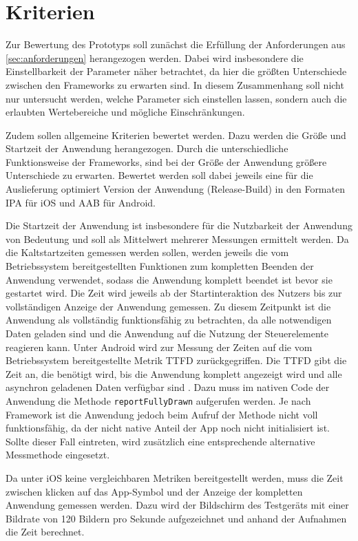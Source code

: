 \section{Kriterien}
\label{sec:kriterien}

Zur Bewertung des Prototyps soll zunächst die Erfüllung der Anforderungen aus \autoref{sec:anforderungen} herangezogen werden.
Dabei wird insbesondere die Einstellbarkeit der Parameter näher betrachtet, da hier die größten Unterschiede zwischen den Frameworks zu erwarten sind.
In diesem Zusammenhang soll nicht nur untersucht werden, welche Parameter sich einstellen lassen, sondern auch die erlaubten Wertebereiche und mögliche Einschränkungen.

Zudem sollen allgemeine Kriterien bewertet werden.
Dazu werden die Größe und Startzeit der Anwendung herangezogen.
Durch die unterschiedliche Funktionsweise der Frameworks, sind bei der Größe der Anwendung größere Unterschiede zu erwarten.
Bewertet werden soll dabei jeweils eine für die Auslieferung optimiert Version der Anwendung (Release-Build) in den Formaten \ac{IPA} für iOS und \ac{AAB} für Android.

Die Startzeit der Anwendung ist insbesondere für die Nutzbarkeit der Anwendung von Bedeutung und soll als Mittelwert mehrerer Messungen ermittelt werden.
Da die Kaltstartzeiten gemessen werden sollen, werden jeweils die vom Betriebssystem bereitgestellten Funktionen zum kompletten Beenden der Anwendung verwendet, sodass die Anwendung komplett beendet ist bevor sie gestartet wird.
Die Zeit wird jeweils ab der Startinteraktion des Nutzers bis zur vollständigen Anzeige der Anwendung gemessen.
Zu diesem Zeitpunkt ist die Anwendung als vollständig funktionsfähig zu betrachten, da alle notwendigen Daten geladen sind und die Anwendung auf die Nutzung der Steuerelemente reagieren kann.
Unter Android wird zur Messung der Zeiten auf die vom Betriebssystem bereitgestellte Metrik \ac{TTFD} zurückgegriffen.
Die \ac{TTFD} gibt die Zeit an, die benötigt wird, bis die Anwendung komplett angezeigt wird und alle asynchron geladenen Daten verfügbar sind \cite{Android_LaunchTime}.
Dazu muss im nativen Code der Anwendung die Methode \texttt{reportFullyDrawn} aufgerufen werden.
Je nach Framework ist die Anwendung jedoch beim Aufruf der Methode nicht voll funktionsfähig, da der nicht native Anteil der App noch nicht initialisiert ist.
Sollte dieser Fall eintreten, wird zusätzlich eine entsprechende alternative Messmethode eingesetzt.

Da unter iOS keine vergleichbaren Metriken bereitgestellt werden, muss die Zeit zwischen klicken auf das App-Symbol und der Anzeige der kompletten Anwendung gemessen werden.
Dazu wird der Bildschirm des Testgeräts mit einer Bildrate von 120 Bildern pro Sekunde aufgezeichnet und anhand der Aufnahmen die Zeit berechnet.


